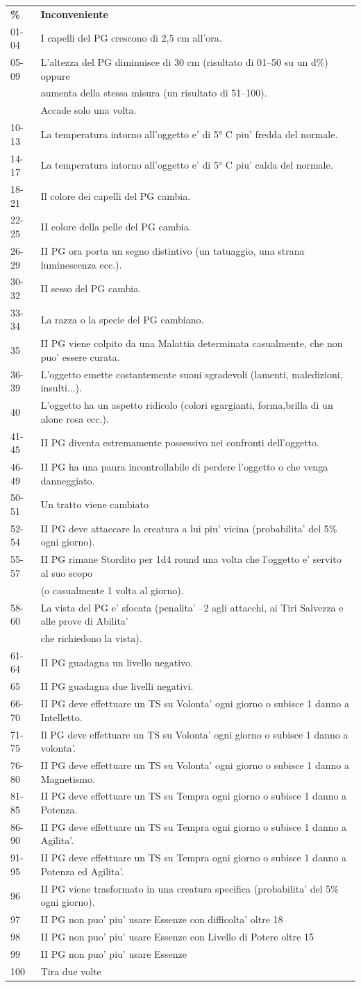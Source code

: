 \documentclass[a4paper,11pt,twoside,openany]{book}
\begin{document}
{%
\begin{tabular}{ll}	
\toprule
\textbf{\%} & \textbf{Inconveniente}\tabularnewline
01-04 & I capelli del PG crescono di 2,5 cm all'ora.\tabularnewline
05-09 & L'altezza del PG diminuisce di 30 cm (risultato di 01--50
su un d\%) oppure \\
&aumenta della stessa misura (un risultato di 51--100).\\
&Accade solo una volta.\tabularnewline
10-13 & La temperatura intorno all'oggetto e' di 5° C piu' fredda del normale.\tabularnewline
14-17 & La temperatura intorno all'oggetto e' di 5° C piu' calda del normale.\tabularnewline
18-21 & Il colore dei capelli del PG cambia.\tabularnewline
22-25 & II colore della pelle del PG cambia.\tabularnewline
26-29 & II PG ora porta un segno distintivo (un tatuaggio, una strana
luminescenza ecc.).\tabularnewline
30-32 & II sesso del PG cambia.\tabularnewline
33-34 & La razza o la specie del PG cambiano.\tabularnewline
35 & II PG viene colpito da una Malattia determinata casualmente,
che non puo' essere curata.\tabularnewline
36-39 & L'oggetto emette costantemente suoni sgradevoli (lamenti, maledizioni, insulti...).\tabularnewline
40 & L'oggetto ha un aspetto ridicolo (colori sgargianti, forma,brilla di un alone rosa ecc.).\tabularnewline
41-45 & II PG diventa estremamente possessivo nei confronti dell'oggetto.\tabularnewline
46-49 & II PG ha una paura incontrollabile di perdere l'oggetto o
che venga danneggiato.\tabularnewline
50-51 & Un tratto viene cambiato\tabularnewline
52-54 & II PG deve attaccare la creatura a lui piu' vicina (probabilita'
del 5\% ogni giorno).\tabularnewline
55-57 & II PG rimane Stordito per 1d4 round una volta che l'oggetto
e' servito al suo scopo\\
&(o casualmente 1 volta al giorno).\tabularnewline
58-60 & La vista del PG e' sfocata (penalita' --2 agli attacchi,
ai Tiri Salvezza e alle prove di Abilita'\\
&che richiedono la vista).\tabularnewline
61-64 & II PG guadagna un livello negativo.\tabularnewline
65 & II PG guadagna due livelli negativi.\tabularnewline
66-70 & II PG deve effettuare un TS su Volonta' ogni giorno
o subisce 1 danno a Intelletto.\tabularnewline
71-75 & Il PG deve effettuare un TS su Volonta' ogni giorno
o subisce 1 danno a volonta'.\tabularnewline
76-80 & II PG deve effettuare un TS su Volonta' ogni giorno
o subisce 1 danno a Magnetismo.\tabularnewline
81-85 & II PG deve effettuare un TS su Tempra ogni giorno
o subisce 1 danno a Potenza.\tabularnewline
86-90 & II PG deve effettuare un TS su Tempra ogni giorno
o subisce 1 danno a Agilita'.\tabularnewline
91-95 & II PG deve effettuare un TS su Tempra ogni giorno
o subisce 1 danno a Potenza ed Agilita'.\tabularnewline
96 & II PG viene trasformato in una creatura specifica (probabilita'
del 5\% ogni giorno).\tabularnewline
97 & II PG non puo' piu' usare Essenze con difficolta' oltre 18\tabularnewline
98 & II PG non puo' piu' usare Essenze con Livello di Potere oltre
15\tabularnewline
99 & II PG non puo' piu' usare Essenze\tabularnewline
100 & Tira due volte\tabularnewline


\end{tabular}}
\end{document}
